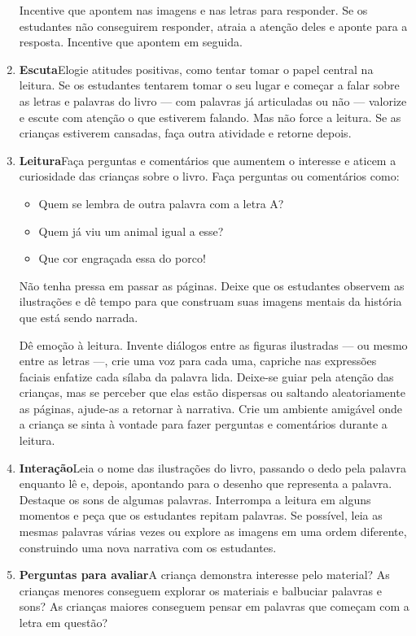 \documentclass[11pt]{extarticle}
\begin{document}
\begin{enumerate}
Incentive que apontem nas imagens e nas letras para responder. Se os estudantes não 
conseguirem responder, atraia a atenção deles e aponte 
para a resposta. Incentive que apontem em seguida. 

\item \textbf{Escuta}\quad Elogie atitudes positivas, como 
tentar tomar o papel central na leitura. Se os estudantes tentarem 
tomar o seu lugar e começar a falar sobre as letras e palavras do livro --- com palavras já articuladas 
ou não --- valorize e escute com atenção o que estiverem falando. Mas não 
force a leitura. Se as crianças estiverem cansadas, faça outra atividade 
e retorne depois. 

\item \textbf{Leitura}\quad Faça perguntas e comentários que aumentem o 
interesse e aticem a curiosidade das crianças sobre o livro. Faça 
perguntas ou comentários como: 

\begin{itemize}
\item Quem se lembra de outra palavra com a letra A?
\item Quem já viu um animal igual a esse?
\item Que cor engraçada essa do porco!
\end{itemize}

Não tenha pressa em passar as páginas. Deixe que os estudantes 
observem as ilustrações e dê tempo para que construam suas imagens 
mentais da história que está sendo narrada. 

Dê emoção 
à leitura. Invente diálogos entre as figuras ilustradas --- ou mesmo entre as letras ---, crie uma voz para 
cada uma, capriche nas expressões faciais enfatize cada sílaba da palavra lida.
Deixe-se guiar pela atenção das crianças, mas se perceber que 
elas estão dispersas ou saltando aleatoriamente as páginas, ajude-as 
a retornar à narrativa. Crie um ambiente amigável onde a criança 
se sinta à vontade para fazer perguntas e comentários durante a leitura.

\item \textbf{Interação}\quad Leia o nome das ilustrações do livro, passando o dedo pela palavra enquanto lê e, depois, apontando para o desenho que representa a palavra.
Destaque os sons de algumas 
palavras. Interrompa a leitura em alguns momentos e peça que 
os estudantes repitam palavras. Se possível, 
leia as mesmas palavras várias vezes ou explore as imagens em uma ordem 
diferente, construindo uma nova narrativa com os estudantes. 

\item \textbf{Perguntas para avaliar}\quad A criança demonstra interesse pelo material? As crianças menores conseguem explorar os materiais e balbuciar palavras e sons? As crianças maiores conseguem pensar em palavras que começam com a letra em questão?
\end{enumerate}
\end{document}
